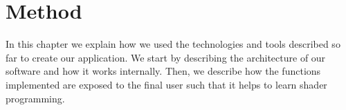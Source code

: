 \chapter{Method}
In this chapter we explain how we used the technologies and tools described so far to create our application. We start by describing the architecture of our software and how it works internally. Then, we describe how the functions implemented are exposed to the final user such that it helps to learn shader programming.




